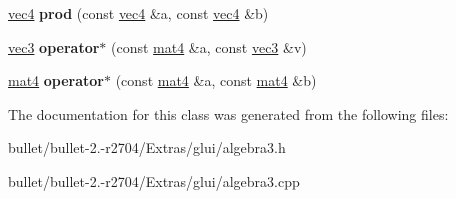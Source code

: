 \begin{DoxyCompactItemize}
\item 
\hypertarget{classvec4_a63ceed040a54841b149af112fe18d491}{\hyperlink{classvec4}{vec4} {\bfseries prod} (const \hyperlink{classvec4}{vec4} \&a, const \hyperlink{classvec4}{vec4} \&b)}\label{classvec4_a63ceed040a54841b149af112fe18d491}

\item 
\hypertarget{classvec4_a3a7a7dfc514a58f3c889b48fa4745815}{\hyperlink{classvec3}{vec3} {\bfseries operator$\ast$} (const \hyperlink{classmat4}{mat4} \&a, const \hyperlink{classvec3}{vec3} \&v)}\label{classvec4_a3a7a7dfc514a58f3c889b48fa4745815}

\item 
\hypertarget{classvec4_a15e77864e523807c2e4d9172f58cc96b}{\hyperlink{classmat4}{mat4} {\bfseries operator$\ast$} (const \hyperlink{classmat4}{mat4} \&a, const \hyperlink{classmat4}{mat4} \&b)}\label{classvec4_a15e77864e523807c2e4d9172f58cc96b}

\end{DoxyCompactItemize}


The documentation for this class was generated from the following files\+:\begin{DoxyCompactItemize}
\item 
bullet/bullet-\/2.-\/r2704/\+Extras/glui/algebra3.\+h\item 
bullet/bullet-\/2.-\/r2704/\+Extras/glui/algebra3.\+cpp\end{DoxyCompactItemize}
